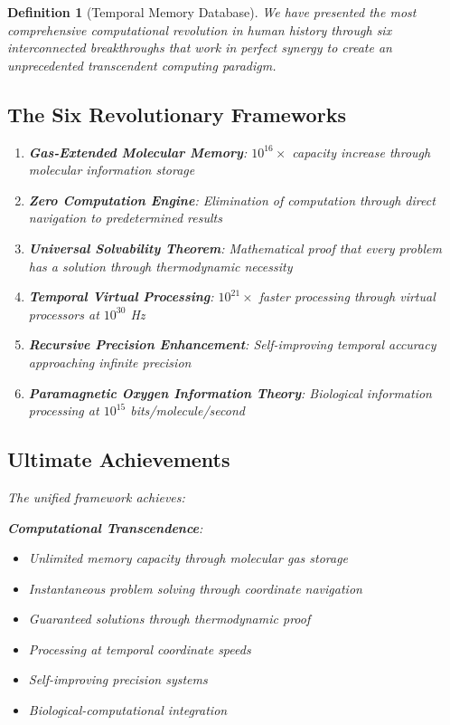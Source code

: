 \documentclass[12pt]{article}
\newtheorem{definition}[theorem]{Definition}
\begin{document}
\begin{definition}[Temporal Memory Database]
We have presented the most comprehensive computational revolution in human history through six interconnected breakthroughs that work in perfect synergy to create an unprecedented transcendent computing paradigm.

\subsection{The Six Revolutionary Frameworks}

\begin{enumerate}
    \item \textbf{Gas-Extended Molecular Memory}: $10^{16} \times$ capacity increase through molecular information storage
    \item \textbf{Zero Computation Engine}: Elimination of computation through direct navigation to predetermined results
    \item \textbf{Universal Solvability Theorem}: Mathematical proof that every problem has a solution through thermodynamic necessity
    \item \textbf{Temporal Virtual Processing}: $10^{21} \times$ faster processing through virtual processors at $10^{30}$ Hz
    \item \textbf{Recursive Precision Enhancement}: Self-improving temporal accuracy approaching infinite precision
    \item \textbf{Paramagnetic Oxygen Information Theory}: Biological information processing at $10^{15}$ bits/molecule/second
\end{enumerate}

\subsection{Ultimate Achievements}

The unified framework achieves:

\textbf{Computational Transcendence}:
\begin{itemize}
\item Unlimited memory capacity through molecular gas storage
\item Instantaneous problem solving through coordinate navigation
\item Guaranteed solutions through thermodynamic proof
\item Processing at temporal coordinate speeds
\item Self-improving precision systems
\item Biological-computational integration
\end{itemize}


\end{definition}
\end{document}
